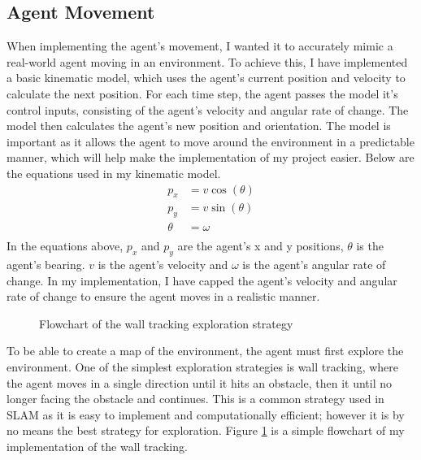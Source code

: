 \documentclass[12pt]{article}
\begin{document}
\subsection{Agent Movement}
When implementing the agent's movement, I wanted it to accurately mimic a real-world agent moving in an environment. To achieve this,
I have implemented a basic kinematic model, which uses the agent's current position and velocity to calculate the next position. For
each time step, the agent passes the model it's control inputs, consisting of the agent's velocity and angular rate of change. The model
then calculates the agent's new position and orientation. The model is important as it allows the agent to move around the environment
in a predictable manner, which will help make the implementation of my project easier. Below are the equations used in my kinematic model. \\
\begin{equation}
    \begin{aligned}
        p_x &= v \cos(\theta) \\
        p_y &= v \sin(\theta) \\
        \theta &= \omega \\
    \end{aligned}
\end{equation}
In the equations above, \(p_x\) and \(p_y\) are the agent's x and y positions, \(\theta\) is the agent's bearing. \(v\) is the agent's velocity
and \(\omega\) is the agent's angular rate of change. In my implementation, I have capped the agent's velocity and angular rate of change
to ensure the agent moves in a realistic manner.\\
\begin{figure}[H]
    \centering
    \caption{Flowchart of the wall tracking exploration strategy}
    \label{fig:wall_tracking_flowchart}
\end{figure}
To be able to create a map of the environment, the agent must first explore the environment. One of the simplest exploration strategies
is wall tracking, where the agent moves in a single direction until it hits an obstacle, then it until no longer facing the obstacle and continues.
This is a common strategy used in SLAM as it is easy to implement and computationally efficient; however it is by no means the best strategy
for exploration. Figure \ref{fig:wall_tracking_flowchart} is a simple flowchart of my implementation of the wall tracking.\\
\end{document}
